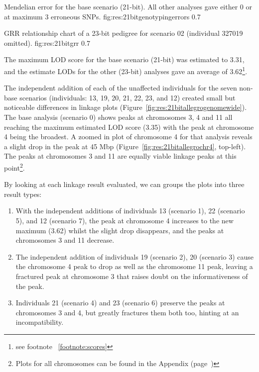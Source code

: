 	{Mendelian error for the base scenario (21-bit). All other analyses gave either 0 or at maximum 3 erroneous SNPs.}
	{fig:res:21bitgenotypingerrors}
	{0.7}

	{GRR relationship chart of a 23-bit pedigree for scenario 02 (individual 327019 omitted).}
	{fig:res:21bitgrr}
	{0.7}

The maximum LOD score for the base scenario (21-bit) was estimated to 3.31, and the estimate LODs for the other (23-bit) analyses gave an average of 3.62\footnote{see footnote ~\ref{footnote:scores}}. 

The independent addition of each of the unaffected individuals for the seven non-base scenarios (individuals: 13, 19, 20, 21, 22, 23, and 12) created small but noticeable differences in linkage plots (Figure~\ref{fig:res:21bitallegrogenomewide}). The base analysis (scenario 0) shows peaks at chromosomes 3, 4 and 11 all reaching the maximum estimated LOD score (3.35) with the peak at chromosome 4 being the broadest. A zoomed in plot of chromosome 4 for that analysis reveals a slight drop in the peak at 45 Mbp (Figure~\ref{fig:res:21bitallegrochr4}, top-left). The peaks at chromosomes 3 and 11 are equally viable linkage peaks at this point\footnote{Plots for all chromosomes can be found in the Appendix (page~\pageref{ref:app:21bitplots})}.

By looking at each linkage result evaluated, we can groups the plots into three result types:
\begin{enumerate}
\item{With the independent additions of individuals 13 (scenario 1),  22 (scenario 5), and 12 (scenario 7),  the peak at chromosome 4 increases to the new maximum (3.62) whilst the slight drop disappears, and the peaks at chromosomes 3 and 11 decrease.}
\item{The independent addition of individuals 19 (scenario 2), 20 (scenario 3) cause the chromosome 4 peak to drop as well as the chromosome 11 peak, leaving a fractured peak at chromosome 3 that raises doubt on the informativeness of the peak.}
\item{Individuals 21 (scenario 4) and 23 (scenario 6) preserve the peaks at chromosomes 3 and 4, but greatly fractures them both too, hinting at an incompatibility.}
\end{enumerate}

